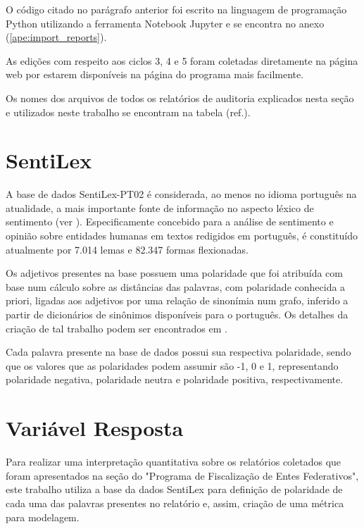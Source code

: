 O código citado no parágrafo anterior foi escrito na linguagem de programação Python utilizando a ferramenta Notebook Jupyter e se encontra no anexo (\ref{ape:import_reports}).

As edições com respeito aos ciclos 3, 4 e 5 foram coletadas diretamente na página web por estarem disponíveis na página do programa mais facilmente.

Os nomes dos arquivos de todos os relatórios de auditoria explicados nesta seção e utilizados neste trabalho se encontram na tabela (ref.).

\section{SentiLex}
\label{sec:sentilex}

A base de dados SentiLex-PT02 é considerada, ao menos no idioma português na atualidade, a mais importante fonte de informação no aspecto léxico de sentimento (ver \citet{BeckerTumitan2014}). Especificamente concebido para a análise de sentimento e opinião sobre entidades humanas em textos redigidos em português, é constituído atualmente por 7.014 lemas e 82.347 formas flexionadas.

Os adjetivos presentes na base possuem uma polaridade que foi atribuída com base num cálculo sobre as distâncias das palavras, com polaridade conhecida a priori, ligadas aos adjetivos por uma relação de sinonímia num grafo, inferido a partir de dicionários de sinônimos disponíveis para o português. Os detalhes da criação de tal trabalho podem ser encontrados em \citet{Silva2012}.

Cada palavra presente na base de dados possui sua respectiva polaridade, sendo que os valores que as polaridades podem assumir são -1, 0 e 1, representando polaridade negativa, polaridade neutra e polaridade positiva, respectivamente.

\section{Variável Resposta}
\label{sec:variavel_resposta}

Para realizar uma interpretação quantitativa sobre os relatórios coletados que foram apresentados na seção do "Programa de Fiscalização de Entes Federativos", este trabalho utiliza a base da dados SentiLex para definição de polaridade de cada uma das palavras presentes no relatório e, assim, criação de uma métrica para modelagem.

